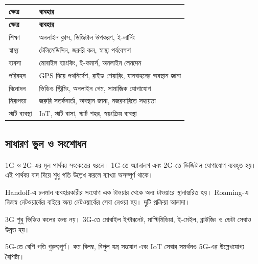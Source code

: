 \begingroup
\begin{longtable}{|p{}|p{}|}
\hline
\textbf{ক্ষেত্র} & \textbf{ব্যবহার} \\
\hline
\endfirsthead
\hline
\textbf{ক্ষেত্র} & \textbf{ব্যবহার} \\
\hline
\endhead

শিক্ষা & অনলাইন ক্লাস, ডিজিটাল উপকরণ, ই-লার্নিং \\
\hline
স্বাস্থ্য & টেলিমেডিসিন, জরুরি কল, স্বাস্থ্য পর্যবেক্ষণ \\
\hline
ব্যবসা & মোবাইল ব্যাংকিং, ই-কমার্স, অনলাইন লেনদেন \\
\hline
পরিবহন & GPS দিয়ে পথনির্দেশ, রাইড শেয়ারিং, যানবাহনের অবস্থান জানা \\
\hline
বিনোদন & ভিডিও স্ট্রিমিং, অনলাইন গেম, সামাজিক যোগাযোগ \\
\hline
নিরাপত্তা & জরুরি সতর্কবার্তা, অবস্থান জানা, নজরদারিতে সহায়তা \\
\hline
স্মার্ট ব্যবস্থা & IoT, স্মার্ট বাসা, স্মার্ট শহর, স্বয়ংক্রিয় ব্যবস্থা \\
\hline
\end{longtable}
\endgroup




\subsection{সাধারণ ভুল ও সংশোধন}

1G ও 2G-এর মূল পার্থক্য সংকেতের ধরনে। 1G-তে অ্যানালগ এবং 2G-তে ডিজিটাল যোগাযোগ ব্যবহৃত হয়। এই পার্থক্য বাদ দিয়ে শুধু গতি উল্লেখ করলে ব্যাখ্যা অসম্পূর্ণ থাকে।

Handoff-এ চলমান ব্যবহারকারীর সংযোগ এক টাওয়ার থেকে অন্য টাওয়ারে স্থানান্তরিত হয়। Roaming-এ নিজস্ব নেটওয়ার্কের বাইরে অন্য নেটওয়ার্কের সেবা নেওয়া হয়। দুটি প্রক্রিয়া আলাদা।

3G শুধু ভিডিও কলের জন্য নয়। 3G-তে মোবাইল ইন্টারনেট, মাল্টিমিডিয়া, ই-মেইল, ব্রাউজিং ও ডেটা সেবাও উন্নত হয়।

5G-তে বেশি গতি গুরুত্বপূর্ণ। কম বিলম্ব, বিপুল যন্ত্র সংযোগ এবং IoT সেবার সমর্থনও 5G-এর উল্লেখযোগ্য বৈশিষ্ট্য।

